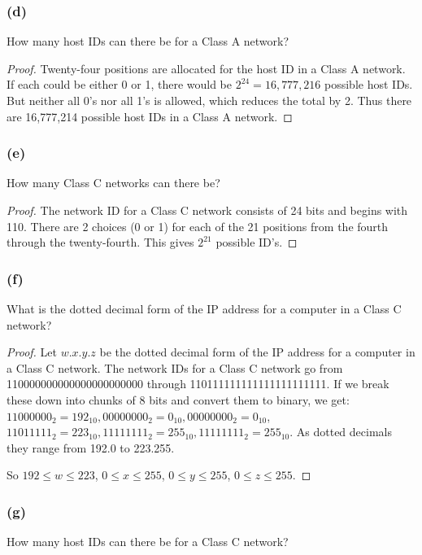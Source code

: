 \documentclass[14pt]{extarticle}
\begin{document}
\subsubsection{(d)}
How many host IDs can there be for a Class A network?

\begin{proof}
Twenty-four positions are allocated for the host ID in a Class A network. If each could be either 0 or 1, there 
would be \(2^{24} = 16,777,216\) possible host IDs. But neither all 0’s nor all 1’s is allowed, which reduces the 
total by 2. Thus there are 16,777,214 possible host IDs in a Class A network.
\end{proof}

\subsubsection{(e)}
How many Class C networks can there be?

\begin{proof}
The network ID for a Class C network consists of 24 bits and begins with 110. There are 2 choices (0 or 1) for each 
of the 21 positions from the fourth through the twenty-fourth. This gives \(2^{21}\) possible ID’s. 
\end{proof}

\subsubsection{(f)}
What is the dotted decimal form of the IP address for a computer in a Class C network?

\begin{proof}
Let \(w.x.y.z\) be the dotted decimal form of the IP address for a computer in a Class C network. The network IDs for a 
Class C network go from 110000000000000000000000 through 110111111111111111111111. If we break these down into chunks 
of 8 bits and convert them to binary, we get: \(11000000_2 = 192_{10}, 00000000_2 = 0_{10}, 00000000_2 = 0_{10}\), 
\(11011111_2 = 223_{10}, 11111111_2 = 255_{10}, 11111111_2 = 255_{10}\). As dotted decimals they range from 192.0 to 
223.255. 

So \(192 \leq w \leq 223\), \(0 \leq x \leq 255\), \(0 \leq y \leq 255\), \(0 \leq z \leq 255\).
\end{proof}

\subsubsection{(g)}
How many host IDs can there be for a Class C network?
\end{document}
